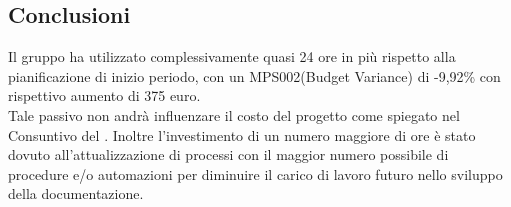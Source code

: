 \documentclass[PianoDiQualifica.tex]{subfiles}
\begin{document}
\subsection{Conclusioni}
Il gruppo ha utilizzato complessivamente quasi 24 ore in più rispetto alla pianificazione di inizio periodo, con un MPS002(Budget Variance) di -9,92\% con rispettivo aumento di 375 euro.\\
Tale passivo non andrà influenzare il costo del progetto come spiegato nel Consuntivo del \pdp{}.
Inoltre l'investimento di un numero maggiore di ore è stato dovuto all'attualizzazione di processi con il maggior numero possibile di procedure e/o automazioni per diminuire il carico di lavoro futuro nello sviluppo della documentazione.

	


\end{document}
